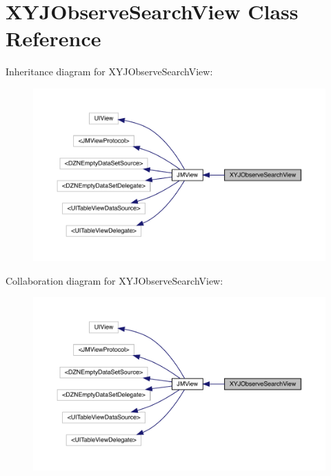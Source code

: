 \hypertarget{interface_x_y_j_observe_search_view}{}\section{X\+Y\+J\+Observe\+Search\+View Class Reference}
\label{interface_x_y_j_observe_search_view}


Inheritance diagram for X\+Y\+J\+Observe\+Search\+View\+:\nopagebreak
\begin{figure}[H]
\begin{center}
\leavevmode
\includegraphics[width=350pt]{interface_x_y_j_observe_search_view__inherit__graph}
\end{center}
\end{figure}


Collaboration diagram for X\+Y\+J\+Observe\+Search\+View\+:\nopagebreak
\begin{figure}[H]
\begin{center}
\leavevmode
\includegraphics[width=350pt]{interface_x_y_j_observe_search_view__coll__graph}
\end{center}
\end{figure}

